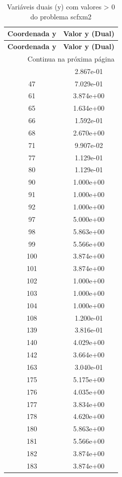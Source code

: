 \documentclass[12pt]{article}
\begin{document}
\begin{longtable}{@{}cc@{}}
\caption{Variáveis duais (y) com valores > 0 do problema scfxm2} \\
\toprule
\textbf{Coordenada y} & \textbf{Valor y (Dual)} \\
\midrule
\endfirsthead

\toprule
\textbf{Coordenada y} & \textbf{Valor y (Dual)} \\
\midrule
\endhead

\midrule \multicolumn{2}{r}{{Continua na próxima página}} \\ \midrule
\endfoot

\bottomrule
\endlastfoot
29 & 2.867e-01 \\
47 & 7.029e-01 \\
61 & 3.874e+00 \\
65 & 1.634e+00 \\
66 & 1.592e-01 \\
68 & 2.670e+00 \\
71 & 9.907e-02 \\
77 & 1.129e-01 \\
80 & 1.129e-01 \\
90 & 1.000e+00 \\
91 & 1.000e+00 \\
92 & 1.000e+00 \\
97 & 5.000e+00 \\
98 & 5.863e+00 \\
99 & 5.566e+00 \\
100 & 3.874e+00 \\
101 & 3.874e+00 \\
102 & 1.000e+00 \\
103 & 1.000e+00 \\
104 & 1.000e+00 \\
108 & 1.200e-01 \\
139 & 3.816e-01 \\
140 & 4.029e+00 \\
142 & 3.664e+00 \\
163 & 3.040e-01 \\
175 & 5.175e+00 \\
176 & 4.035e+00 \\
177 & 3.834e+00 \\
178 & 4.620e+00 \\
180 & 5.863e+00 \\
181 & 5.566e+00 \\
182 & 3.874e+00 \\
183 & 3.874e+00 \\

\end{longtable}
\end{document}
